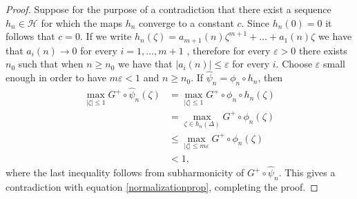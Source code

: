 \documentclass[10pt,a4paper]{article}
\begin{document}
\begin{proof}
Suppose for the purpose of a contradiction that there exist a sequence $h_n\in \mathcal H$ for which the maps $h_n$ converge to a constant $c$. Since $h_n(0)=0$ it follows that $c=0$. If we write $h_n(\zeta)=a_{m+1}(n)\zeta^{m+1}+\dots +a_1(n)\zeta$ we have that $a_i(n)\to 0$ for every $i=1,\dots,m+1$ , therefore for every $\varepsilon>0$ there exists $n_0$ such that when $n\geq n_0$ we have that $|a_i(n)|\leq\varepsilon$ for every $i$. Choose $\varepsilon$ small enough in order to have $m\varepsilon<1$ and $n\geq n_0$. If $\widehat\psi_n=\phi_n\circ h_n$, then
\begin{align*}
\max_{|\zeta|\leq 1} G^+\circ\widehat\psi_n(\zeta)&=\max_{|\zeta|\leq 1} G^+\circ\phi_n\circ h_n(\zeta)\\
&=\max_{\zeta\in h_n(\Delta)}G^+\circ \phi_n(\zeta)\\
&\leq \max_{|\zeta|\leq m\varepsilon}G^+\circ\phi_n(\zeta)\\
&<1,
\end{align*}
where the last inequality follows from subharmonicity of $G^+\circ\widehat\psi_n$. This gives a contradiction with equation \eqref{normalizationprop}, completing the proof.
\end{proof}
\end{document}
